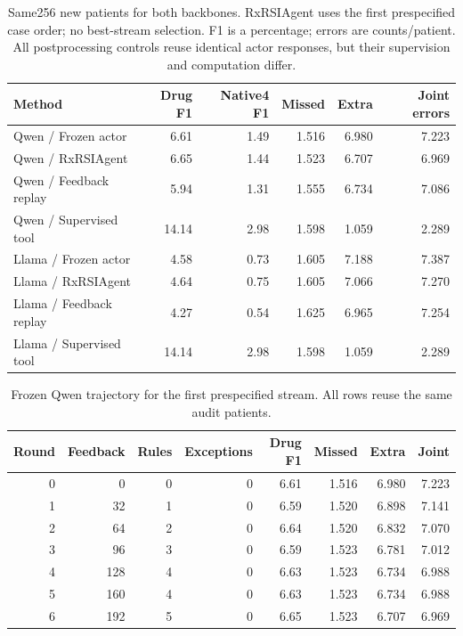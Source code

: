 \begin{table}[t]\centering\small
\caption{Same256 new patients for both backbones. RxRSIAgent uses the first prespecified case order; no best-stream selection. F1 is a percentage; errors are counts/patient. All postprocessing controls reuse identical actor responses, but their supervision and computation differ.}\label{tab:conditional-memory}
\begin{tabular}{@{}lrrrrr@{}}\toprule
Method & Drug F1 & Native4 F1 & Missed & Extra & Joint errors\\\midrule
Qwen / Frozen actor & 6.61 & 1.49 & 1.516 & 6.980 & 7.223\\
Qwen / RxRSIAgent & 6.65 & 1.44 & 1.523 & 6.707 & 6.969\\
Qwen / Feedback replay & 5.94 & 1.31 & 1.555 & 6.734 & 7.086\\
Qwen / Supervised tool & 14.14 & 2.98 & 1.598 & 1.059 & 2.289\\
Llama / Frozen actor & 4.58 & 0.73 & 1.605 & 7.188 & 7.387\\
Llama / RxRSIAgent & 4.64 & 0.75 & 1.605 & 7.066 & 7.270\\
Llama / Feedback replay & 4.27 & 0.54 & 1.625 & 6.965 & 7.254\\
Llama / Supervised tool & 14.14 & 2.98 & 1.598 & 1.059 & 2.289\\
\bottomrule\end{tabular}\end{table}
\begin{table}[t]\centering\small
\caption{Frozen Qwen trajectory for the first prespecified stream. All rows reuse the same audit patients.}\label{tab:conditional-rounds}
\begin{tabular}{@{}rrrrrrrr@{}}\toprule
Round & Feedback & Rules & Exceptions & Drug F1 & Missed & Extra & Joint\\\midrule
0 & 0 & 0 & 0 & 6.61 & 1.516 & 6.980 & 7.223\\
1 & 32 & 1 & 0 & 6.59 & 1.520 & 6.898 & 7.141\\
2 & 64 & 2 & 0 & 6.64 & 1.520 & 6.832 & 7.070\\
3 & 96 & 3 & 0 & 6.59 & 1.523 & 6.781 & 7.012\\
4 & 128 & 4 & 0 & 6.63 & 1.523 & 6.734 & 6.988\\
5 & 160 & 4 & 0 & 6.63 & 1.523 & 6.734 & 6.988\\
6 & 192 & 5 & 0 & 6.65 & 1.523 & 6.707 & 6.969\\
\bottomrule\end{tabular}\end{table}
